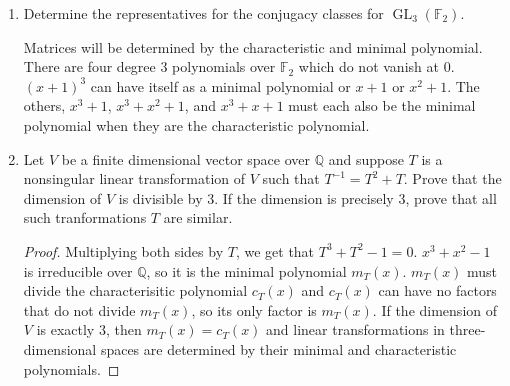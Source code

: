 \documentclass{report}
\newcommand{\Q}{\mathbb{Q}}
\newcommand{\F}{\mathbb{F}}
\DeclareMathOperator{\GL}{GL}
\begin{document}
\begin{enumerate}
\begin{proof}
\begin{enumerate} [label=(\roman*)]
			\end{enumerate}
		\end{proof}
		
		\setcounter{enumi}{16}
	\item Determine the representatives for the conjugacy classes for $\GL_3(\F_2)$.
		\newline

		Matrices will be determined by the characteristic and minimal polynomial. 
		There are four degree $3$ polynomials over $\F_2$ which do not vanish at $0$. $(x+1)^3$ can have itself as a minimal polynomial or $x+1$ or $x^2+1$. 
		The others, $x^3+1$, $x^3+x^2+1$, and $x^3+x+1$ must each also be the minimal polynomial when they are the characteristic polynomial.
	\item Let $V$ be a finite dimensional vector space over $\Q$ and suppose $T$ is a nonsingular linear transformation of $V$ such that $T^{-1}=T^2+T$.
		Prove that the dimension of $V$ is divisible by $3$. If the dimension is precisely $3$, prove that all such tranformations $T$ are similar.
		\begin{proof}
			Multiplying both sides by $T$, we get that $T^3+T^2-1=0$. $x^3+x^2-1$ is irreducible over $\Q$, so it is the minimal polynomial $m_T(x)$.
			$m_T(x)$ must divide the characterisitic polynomial $c_T(x)$ and $c_T(x)$ can have no factors that do not divide $m_T(x)$, so its only factor is $m_T(x)$.
			If the dimension of $V$ is exactly $3$, then $m_T(x)=c_T(x)$ and linear transformations in three-dimensional spaces are determined by their minimal and characteristic polynomials.
		\end{proof}
\end{enumerate}
\end{document}
